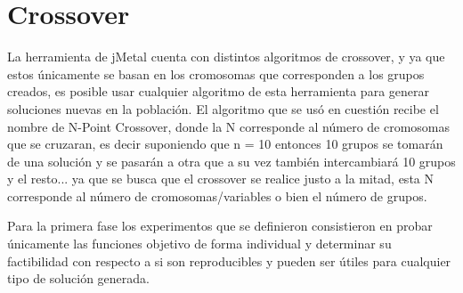 
\section{Crossover}

La herramienta de jMetal cuenta con distintos algoritmos de crossover, y ya que estos únicamente se basan en los cromosomas que corresponden a los grupos creados, es posible usar cualquier algoritmo de esta herramienta para generar soluciones nuevas en la población. El algoritmo que se usó en cuestión recibe el nombre de N-Point Crossover, donde la N corresponde al número de cromosomas que se cruzaran, es decir suponiendo que n = 10 entonces 10 grupos se tomarán de una solución y se pasarán a otra que a su vez también intercambiará 10 grupos y el resto... ya que se busca que el crossover se realice justo a la mitad, esta N corresponde al número de cromosomas/variables o bien el número de grupos.

Para la primera fase los experimentos que se definieron consistieron en probar únicamente las funciones objetivo de forma individual y determinar su factibilidad con respecto a si son reproducibles y pueden ser útiles para cualquier tipo de solución generada.
